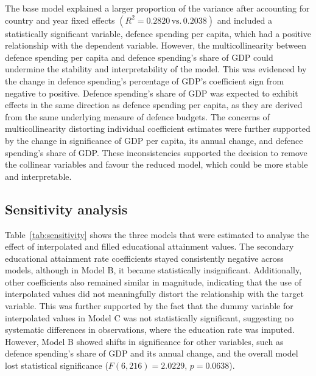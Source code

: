 The base model explained a larger proportion of the variance after accounting for 
country and year fixed effects
$(R^2 = 0.2820\, \text{vs.} \,0.2038)$
and included a statistically significant variable, defence spending per capita, which had a positive 
relationship with the dependent variable. However, the multicollinearity between defence spending per 
capita and defence spending's share of GDP could undermine the stability and interpretability 
of the model. This was evidenced by the change in defence spending's percentage of GDP's 
coefficient sign from negative to positive. Defence spending's share of GDP was expected to exhibit 
effects in the same direction as defence spending per capita, as they are derived from the same underlying 
measure of defence budgets.
The concerns of multicollinearity distorting individual coefficient estimates 
were further supported by the change in significance of 
GDP per capita, its annual change, and defence spending's share of GDP.
These inconsistencies supported the decision to remove the collinear variables and 
favour the reduced model, which could be more stable and interpretable.

\subsection{Sensitivity analysis}

Table~\ref{tab:sensitivity} shows the
three models that were estimated to analyse the effect of interpolated and filled educational attainment values.
The secondary educational attainment rate coefficients stayed consistently negative
across models, although in Model B, it became statistically insignificant. 
Additionally, other coefficients also remained similar in magnitude, indicating 
that the use of interpolated values did not meaningfully distort the 
relationship with the target variable. This was further supported by the fact that 
the dummy variable for 
interpolated values in Model C was not statistically significant, suggesting no systematic 
differences in observations, where the education rate was imputed.
However, Model B showed shifts in significance for other variables, 
such as defence spending's share of GDP and its annual change, 
and the overall model lost
statistical significance ($F(6,216)=2.0229$, $p=0.0638$).

\renewcommand{\arraystretch}{1.2}

